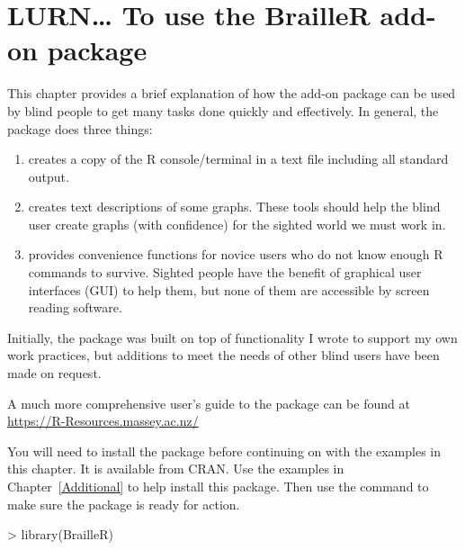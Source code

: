 



\chapter{LURN\ldots{} To use the BrailleR add-on package} 
\label{BrailleR} 
 



 
This chapter provides a brief explanation of  how the  add-on package can be used by blind people to get many tasks done quickly and effectively. In general, the package does three things:\begin{enumerate} 
\item creates a copy of the R console/terminal in a text file including all standard output. 
\item creates text descriptions of some graphs. These tools should help the blind user create graphs (with confidence) for the sighted world we must work in. 
\item provides convenience functions for novice users who do not know enough R commands to survive. Sighted people have the benefit of graphical user interfaces (GUI) to help them, but none of them are accessible by screen reading software. 
\end{enumerate} 
Initially, the package was built on top of functionality I wrote to support my own work practices, but additions to meet the needs of other blind \R{} users have been made on request.  
 
 A much more comprehensive user's guide to the   package can be found at \url{https://R-Resources.massey.ac.nz/}

You will need to install the  package before continuing on with the examples in this chapter. It is available from CRAN. Use the examples in Chapter~\ref{Additional} to help install this package. Then use the  command to make sure the package is ready for action. 

\begin{Schunk}
\begin{Sinput}
> library(BrailleR) 
\end{Sinput}
\end{Schunk}


